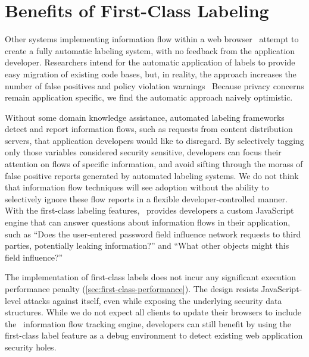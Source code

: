 \section{Benefits of First-Class Labeling}


Other systems implementing information flow within a web browser~\cite{jang.etal+10,meyerovich.livshits+10,just.etal+11} attempt to create a fully automatic labeling system, with no feedback from the application developer.
Researchers intend for the automatic application of labels to provide easy migration of existing code bases, but, in reality, the approach increases the number of false positives and policy violation warnings~\cite{sabelfeld.myers+03, slowinska.bos+09}
Because privacy concerns remain application specific, we find the automatic approach naively optimistic.

Without some domain knowledge assistance, automated labeling frameworks detect and report information flows, such as requests from content distribution servers, that application developers would like to disregard.
By selectively tagging only those variables considered security sensitive, developers can focus their attention on flows of specific information, and avoid sifting through the morass of false positive reports generated by automated labeling systems.
We do not think that information flow techniques will see adoption without the ability to selectively ignore these flow reports in a flexible developer-controlled manner.
With the first-class labeling features, \JitFlow\ provides developers a custom JavaScript engine that can answer questions about information flows in their application, such as ``Does the user-entered password field influence network requests to third parties, potentially leaking information?'' and ``What other objects might this field influence?''

The implementation of first-class labels does not incur any significant execution performance penalty (\autoref{sec:first-class-performance}).
The design resists JavaScript-level attacks against itself, even while exposing the underlying security data structures.
While we do not expect all clients to update their browsers to include the \JitFlow\ information flow tracking engine, developers can still benefit by using the first-class label feature as a debug environment to detect existing web application security holes.

